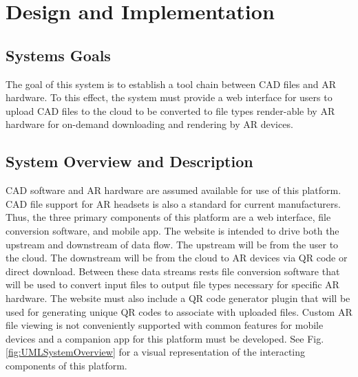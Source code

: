 
\chapter{Design  and Implementation}

\section{Systems Goals}
The goal of this system is to establish a tool chain between CAD files and AR hardware. To this effect, the system must provide a web interface for users to upload CAD files to the cloud to be converted to file types render-able by AR hardware for on-demand downloading and rendering by AR devices.  

\section{System Overview and Description}
CAD software and AR hardware are assumed available for use of this platform. CAD file support for AR headsets is also a standard for current manufacturers. Thus, the three primary components of this platform are a web interface, file conversion software, and mobile app. The website is intended to drive both the upstream and downstream of data flow. The upstream will be from the user to the cloud. The downstream will be from the cloud to AR devices via QR code or direct download. Between these data streams rests file conversion software that will be used to convert input files to output file types necessary for specific AR hardware. The website must also include a QR code generator plugin that will be used for generating unique QR codes to associate with uploaded files. Custom AR file viewing is not conveniently supported with common features for mobile devices and a companion app for this platform must be developed. See Fig. \ref{fig:UMLSystemOverview} for a visual representation of the interacting components of this platform.

